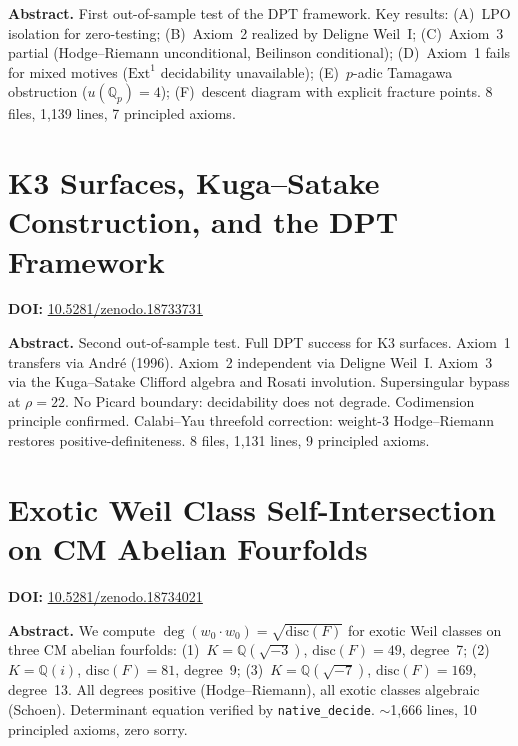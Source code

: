 \documentclass[11pt,a4paper]{article}
\begin{document}
\bigskip
\noindent\textbf{Abstract.}
First out-of-sample test of the DPT framework. Key results: (A)~LPO isolation for zero-testing; (B)~Axiom~2 realized by Deligne Weil~I; (C)~Axiom~3 partial (Hodge--Riemann unconditional, Beilinson conditional); (D)~Axiom~1 fails for mixed motives ($\mathrm{Ext}^1$ decidability unavailable); (E)~$p$-adic Tamagawa obstruction ($u(\mathbb{Q}_p)=4$); (F)~descent diagram with explicit fracture points. 8 files, 1,139 lines, 7 principled axioms.

\section{K3 Surfaces, Kuga--Satake Construction, and the DPT Framework}
\label{sec:p55}
\textbf{DOI:} \href{https://doi.org/10.5281/zenodo.18733731}{10.5281/zenodo.18733731}

\bigskip
\noindent\textbf{Abstract.}
Second out-of-sample test. Full DPT success for K3 surfaces. Axiom~1 transfers via Andr\'e (1996). Axiom~2 independent via Deligne Weil~I. Axiom~3 via the Kuga--Satake Clifford algebra and Rosati involution. Supersingular bypass at $\rho=22$. No Picard boundary: decidability does not degrade. Codimension principle confirmed. Calabi--Yau threefold correction: weight-3 Hodge--Riemann restores positive-definiteness. 8 files, 1,131 lines, 9 principled axioms.

\section{Exotic Weil Class Self-Intersection on CM Abelian Fourfolds}
\label{sec:p56}
\textbf{DOI:} \href{https://doi.org/10.5281/zenodo.18734021}{10.5281/zenodo.18734021}

\bigskip
\noindent\textbf{Abstract.}
We compute $\deg(w_0\cdot w_0)=\sqrt{\mathrm{disc}(F)}$ for exotic Weil classes on three CM abelian fourfolds: (1)~$K=\mathbb{Q}(\sqrt{-3})$, $\mathrm{disc}(F)=49$, degree~7; (2)~$K=\mathbb{Q}(i)$, $\mathrm{disc}(F)=81$, degree~9; (3)~$K=\mathbb{Q}(\sqrt{-7})$, $\mathrm{disc}(F)=169$, degree~13. All degrees positive (Hodge--Riemann), all exotic classes algebraic (Schoen). Determinant equation verified by \texttt{native\_decide}. $\sim$1,666 lines, 10 principled axioms, zero sorry.

\end{document}
